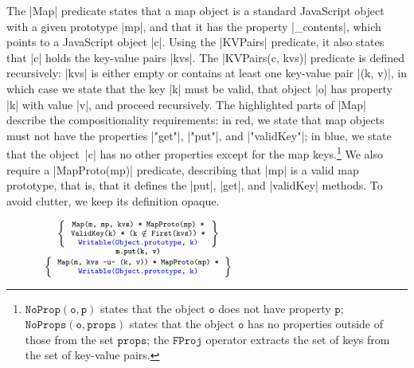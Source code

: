\smallskip
The \jsinline|Map| predicate states that a map object is a standard JavaScript object with a given prototype \jsinline|mp|, and that it has the property \jsinline|_contents|, which points to a  JavaScript object \jsinline|c|.
Using the \jsinline|KVPairs| predicate, %
it also states that \jsinline|c| holds the key-value pairs \jsinline|kvs|. 
The \jsinline|KVPairs(c, kvs)| predicate is defined recursively: \jsinline|kvs| is either empty or contains at least one key-value pair \jsinline|(k, v)|, 
in which case we state that the key \jsinline|k| must be valid, that object \jsinline|o| has  property \jsinline|k| with value \jsinline|v|, and proceed recursively.
The highlighted parts of \jsinline|Map| describe the compositionality requirements: in red, we state that map objects must not have the properties \jsinline|"get"|, \jsinline|"put"|, and \jsinline|"validKey"|; in blue, we state that the object~\jsinline|c| has no other properties except for the map keys.\footnote{$\mathtt{NoProp(o, p)}$  states that the object $\mathtt{o}$ does not have property $\mathtt{p}$; $\mathtt{NoProps(o, props)}$ states that the object $\mathtt{o}$ has no properties outside of those from the set $\mathtt{props}$; the $\mathtt{FProj}$ operator extracts the set of keys from the set of key-value pairs.}
%
We also require a \jsinline|MapProto(mp)| predicate, describing that \jsinline|mp| is a valid map prototype, that is, that it defines the \jsinline|put|, \jsinline|get|, and \jsinline|validKey| methods. To avoid clutter, we keep its definition opaque.

\begin{figure}
\vspace*{0.1cm}
\hspace*{-0.8cm}
$
{\scriptsize
\begin{array}{c}
\left\{ {\begin{array}{c}
 \text{\texttt{Map(m, mp, kvs) * MapProto(mp) *}} \\
 \text{\texttt{ValidKey(k) * (k $\notin$ First(kvs)) *}} \\
 \text{\textcolor{blue}{\texttt{Writable(Object.prototype, k)}}}
\end{array}} \right\} \\
%
\text{\bfseries \texttt{m.put(k, v)}} \\[0.2mm]
%
\left\{ {\begin{array}{c}
 \text{\texttt{Map(m, kvs -u- (k, v)) * MapProto(mp) *}} \\
 \text{\textcolor{blue}{\texttt{Writable(Object.prototype, k)}}} \\
\end{array}} \right\}
\end{array}
} 
$
\vspace*{-0.3cm}
\end{figure}

